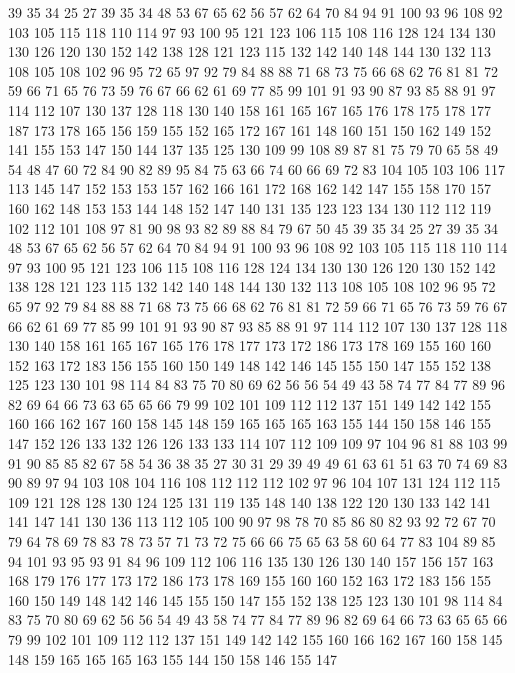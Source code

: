 39 35 34 25 27 39 35 34 48 53 67 65 62 56 57 62 64 70 84 94
91 100 93 96 108 92 103 105 115 118 110 114 97 93 100 95 121 123 106 115
108 116 128 124 134 130 130 126 120 130 152 142 138 128 121 123 115 132 142 140
148 144 130 132 113 108 105 108 102 96 95 72 65 97 92 79 84 88 88 71
68 73 75 66 68 62 76 81 81 72 59 66 71 65 76 73 59 76 67 66
62 61 69 77 85 99 101 91 93 90 87 93 85 88 91 97 114 112 107 130
137 128 118 130 140 158 161 165 167 165 176 178 175 178 177 187 173 178 165 156
159 155 152 165 172 167 161 148 160 151 150 162 149 152 141 155 153 147 150 144
137 135 125 130 109 99 108 89 87 81 75 79 70 65 58 49 54 48 47 60
72 84 90 82 89 95 84 75 63 66 74 60 66 69 72 83 104 105 103 106
117 113 145 147 152 153 153 157 162 166 161 172 168 162 142 147 155 158 170 157
160 162 148 153 153 144 148 152 147 140 131 135 123 123 134 130 112 112 119 102
112 101 108 97 81 90 98 93 82 89 88 84 79 67 50 45 39 35 34 25
27 39 35 34 48 53 67 65 62 56 57 62 64 70 84 94 91 100 93 96
108 92 103 105 115 118 110 114 97 93 100 95 121 123 106 115 108 116 128 124
134 130 130 126 120 130 152 142 138 128 121 123 115 132 142 140 148 144 130 132
113 108 105 108 102 96 95 72 65 97 92 79 84 88 88 71 68 73 75 66
68 62 76 81 81 72 59 66 71 65 76 73 59 76 67 66 62 61 69 77
85 99 101 91 93 90 87 93 85 88 91 97 114 112 107 130 137 128 118 130
140 158 161 165 167 165 176 178 177 173 172 186 173 178 169 155 160 160 152 163
172 183 156 155 160 150 149 148 142 146 145 155 150 147 155 152 138 125 123 130
101 98 114 84 83 75 70 80 69 62 56 56 54 49 43 58 74 77 84 77
89 96 82 69 64 66 73 63 65 65 66 79 99 102 101 109 112 112 137 151
149 142 142 155 160 166 162 167 160 158 145 148 159 165 165 165 163 155 144 150
158 146 155 147 152 126 133 132 126 126 133 133 114 107 112 109 109 97 104 96
81 88 103 99 91 90 85 85 82 67 58 54 36 38 35 27 30 31 29 39
49 49 61 63 61 51 63 70 74 69 83 90 89 97 94 103 108 104 116 108
112 112 112 102 97 96 104 107 131 124 112 115 109 121 128 128 130 124 125 131
119 135 148 140 138 122 120 130 133 142 141 141 147 141 130 136 113 112 105 100
90 97 98 78 70 85 86 80 82 93 92 72 67 70 79 64 78 69 78 83
78 73 57 71 73 72 75 66 66 75 65 63 58 60 64 77 83 104 89 85
94 101 93 95 93 91 84 96 109 112 106 116 135 130 126 130 140 157 156 157
163 168 179 176 177 173 172 186 173 178 169 155 160 160 152 163 172 183 156 155
160 150 149 148 142 146 145 155 150 147 155 152 138 125 123 130 101 98 114 84
83 75 70 80 69 62 56 56 54 49 43 58 74 77 84 77 89 96 82 69
64 66 73 63 65 65 66 79 99 102 101 109 112 112 137 151 149 142 142 155
160 166 162 167 160 158 145 148 159 165 165 165 163 155 144 150 158 146 155 147

